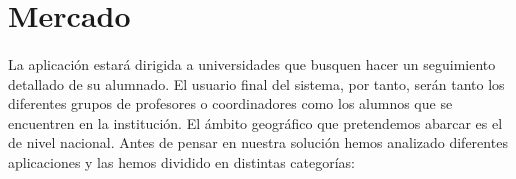 \section{Mercado}

\paragraph{}
La aplicación estará dirigida a universidades que busquen hacer un
seguimiento detallado de su alumnado. El usuario final del sistema,
por tanto, serán tanto los diferentes grupos de profesores o
coordinadores como los alumnos que se encuentren en la institución. El
ámbito geográfico que pretendemos abarcar es el de nivel
nacional. Antes de pensar en nuestra solución hemos analizado diferentes aplicaciones
y las hemos dividido en distintas categorías:

